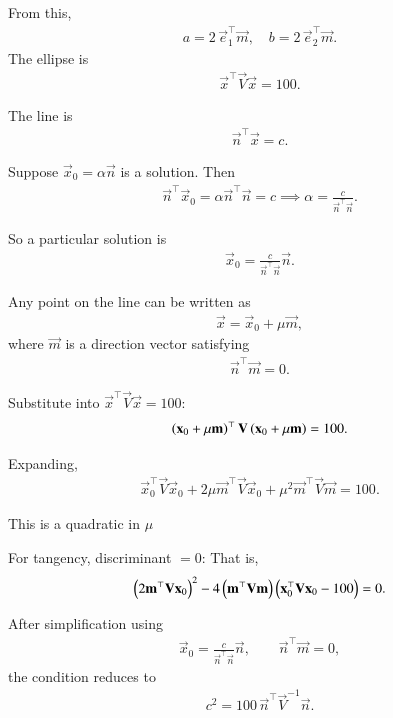 \documentclass[journal]{IEEEtran}
\begin{document}
From this,
\begin{align}
a = 2\,\vec{e}_1^\top\vec{m},\quad
b = 2\,\vec{e}_2^\top\vec{m}.
\end{align}
The ellipse is
\begin{align}
\vec{x}^\top \vec{V}\vec{x} = 100.
\end{align}

The line is
\begin{align}
\vec{n}^\top \vec{x} = c.
\end{align}

Suppose $\vec{x}_0 = \alpha \vec{n}$ is a solution.  
Then
\begin{align}
\vec{n}^\top \vec{x}_0 = \alpha \vec{n}^\top \vec{n} = c
\implies \alpha = \frac{c}{\vec{n}^\top \vec{n}}.
\end{align}

So a particular solution is
\begin{align}
\vec{x}_0 = \frac{c}{\vec{n}^\top \vec{n}} \vec{n}.
\end{align}

Any point on the line can be written as
\begin{align}
\vec{x} = \vec{x}_0 + \mu \vec{m},
\end{align}
where $\vec{m}$ is a direction vector satisfying
\begin{align}
\vec{n}^\top \vec{m} = 0.
\end{align}

Substitute into $\vec{x}^\top \vec{V}\vec{x} = 100$:
\begin{align}
\left(\mathbf{x}_0 + \mu \mathbf{m}\right)^\top \mathbf{V} \left(\mathbf{x}_0 + \mu \mathbf{m}\right) = 100.
\end{align}

Expanding,
\begin{align}
\vec{x}_0^\top \vec{V}\vec{x}_0
+ 2\mu \vec{m}^\top \vec{V}\vec{x}_0
+ \mu^2 \vec{m}^\top \vec{V}\vec{m} = 100.
\end{align}

This is a quadratic in $\mu$

For tangency, discriminant $=0$:
That is,
\begin{align}
\left(2\mathbf{m}^\top \mathbf{V}\mathbf{x}_0\right)^2
- 4\left(\mathbf{m}^\top \mathbf{V}\mathbf{m}\right)
\left(\mathbf{x}_0^\top \mathbf{V}\mathbf{x}_0 - 100\right) = 0.
\end{align}

After simplification using
\begin{align}
\vec{x}_0 = \frac{c}{\vec{n}^\top \vec{n}} \vec{n}, \qquad 
\vec{n}^\top \vec{m} = 0,
\end{align}
the condition reduces to
\begin{align}
c^2 = 100 \,\vec{n}^\top \vec{V}^{-1}\vec{n}.
\end{align}
\end{document}
